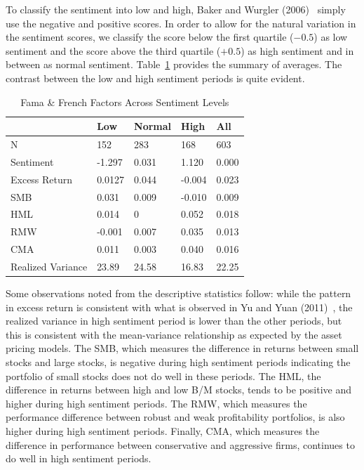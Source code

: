 To classify the sentiment into low and high, Baker and Wurgler (2006)~\cite{baker2006investor} simply use the negative and positive scores. In order to allow for the natural variation in the sentiment scores, we classify the score below the first quartile ($-0.5$) as low sentiment and the score above the third quartile ($+0.5$) as high sentiment and in between as normal sentiment. Table~\ref{tab:famafrench} provides the summary of averages. The contrast between the low and high sentiment periods is quite evident.


        \begin{table}[!ht]
        \caption{Fama \& French Factors Across Sentiment Levels \label{tab:famafrench}}
        \begin{tabular}{lllll}
        & Low &     Normal      & High & All \\ \hline
        N & 152 &  283  & 168 & 603 \\
        Sentiment & -1.297 &  0.031  & 1.120 & 0.000 \\
        Excess Return & 0.0127 &  0.044  & -0.004 & 0.023 \\ 
        SMB & 0.031 &  0.009  & -0.010 & 0.009 \\
        HML & 0.014 & 0 & 0.052 & 0.018 \\
        RMW & -0.001 &  0.007  & 0.035& 0.013 \\
        CMA & 0.011 &  0.003  & 0.040 & 0.016 \\
        Realized Variance & 23.89 &  24.58  & 16.83 & 22.25
        \end{tabular}
        \end{table}


Some observations noted from the descriptive statistics follow: while the pattern in excess return is consistent with what is observed in Yu and Yuan (2011)~\cite{yuyuan}, the realized variance in high sentiment period is lower than the other periods, but this is consistent with the mean-variance relationship as expected by the asset pricing models. The SMB, which measures the difference in returns between small stocks and large stocks, is negative during high sentiment periods indicating the portfolio of small stocks does not do well in these periods. The HML, the difference in returns between high and low B/M stocks, tends to be positive and higher during high sentiment periods. The RMW, which measures the performance difference between robust and weak profitability portfolios, is also higher during high sentiment periods. Finally, CMA, which measures the difference in performance between conservative and aggressive firms, continues to do well in high sentiment periods.


